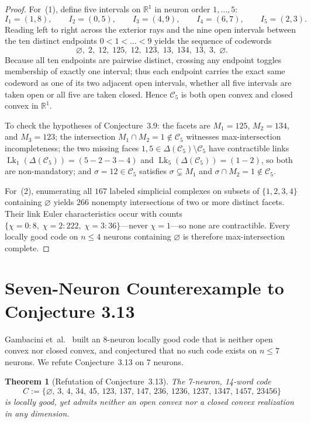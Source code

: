 \documentclass[11pt]{article}
\theoremstyle{plain}
\newtheorem{theorem}{Theorem}
\theoremstyle{definition}
\theoremstyle{remark}
\DeclareMathOperator{\Lk}{Lk}
\begin{document}
\begin{proof}
For~(1), define five intervals on $\mathbb{R}^1$ in neuron order $1, \dots, 5$:
\[
I_1 = (1, 8), \qquad I_2 = (0, 5), \qquad I_3 = (4, 9), \qquad I_4 = (6, 7), \qquad I_5 = (2, 3).
\]
Reading left to right across the exterior rays and the nine open intervals between the ten distinct endpoints $0 < 1 < \dots < 9$ yields the sequence of codewords
\[
\varnothing,\; 2,\; 12,\; 125,\; 12,\; 123,\; 13,\; 134,\; 13,\; 3,\; \varnothing.
\]
Because all ten endpoints are pairwise distinct, crossing any endpoint toggles membership of exactly one interval; thus each endpoint carries the exact same codeword as one of its two adjacent open intervals, whether all five intervals are taken open or all five are taken closed. Hence $\mathcal{C}_5$ is both open convex and closed convex in $\mathbb{R}^1$.

To check the hypotheses of Conjecture~3.9: the facets are $M_1 = 125$, $M_2 = 134$, and $M_3 = 123$; the intersection $M_1 \cap M_2 = 1 \notin \mathcal{C}_5$ witnesses max-intersection incompleteness; the two missing faces $1, 5 \in \Delta(\mathcal{C}_5) \setminus \mathcal{C}_5$ have contractible links $\Lk_1(\Delta(\mathcal{C}_5)) = (5{-}2{-}3{-}4)$ and $\Lk_5(\Delta(\mathcal{C}_5)) = (1{-}2)$, so both are non-mandatory; and $\sigma = 12 \in \mathcal{C}_5$ satisfies $\sigma \subsetneq M_1$ and $\sigma \cap M_2 = 1 \notin \mathcal{C}_5$.

For~(2), enumerating all $167$ labeled simplicial complexes on subsets of $\{1, 2, 3, 4\}$ containing $\varnothing$ yields $266$ nonempty intersections of two or more distinct facets. Their link Euler characteristics occur with counts $\{\chi = 0 : 8,\; \chi = 2 : 222,\; \chi = 3 : 36\}$---never $\chi = 1$---so none are contractible. Every locally good code on $n \le 4$ neurons containing $\varnothing$ is therefore max-intersection complete.
\end{proof}

\section{Seven-Neuron Counterexample to Conjecture 3.13}

Gambacini et~al.~\cite[Theorem~3.11]{gambacini2022} built an 8-neuron locally good code that is neither open convex nor closed convex, and conjectured that no such code exists on $n \le 7$ neurons. We refute Conjecture~3.13 on 7 neurons.

\begin{theorem}[Refutation of Conjecture~3.13]\label{thm:conj313}
The 7-neuron, 14-word code
\[
C := \{\varnothing,\, 3,\, 4,\, 34,\, 45,\, 123,\, 137,\, 147,\, 236,\, 1236,\, 1237,\, 1347,\, 1457,\, 23456\}
\]
is locally good, yet admits neither an open convex nor a closed convex realization in any dimension.
\end{theorem}
\end{document}
